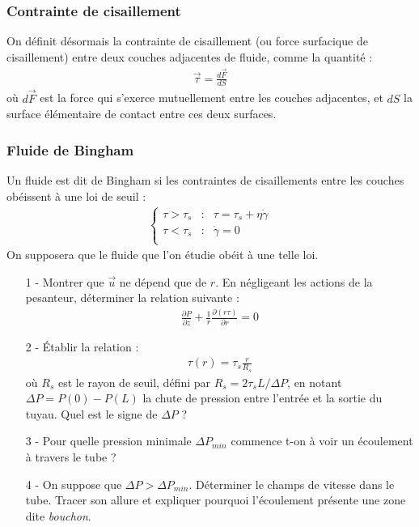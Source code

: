 \documentclass{report}
\begin{document}
\subsubsection*{Contrainte de cisaillement}

On définit désormais la contrainte de cisaillement (ou force surfacique de cisaillement) entre deux couches adjacentes de fluide, comme la quantité : 
\begin{align*}
	\vec{\tau}=\frac{d\vec{F}}{dS}
\end{align*}
où $d\vec{F}$ est la force qui s'exerce mutuellement entre les couches adjacentes, et $dS$ la surface élémentaire de contact entre ces deux surfaces.

\subsubsection*{Fluide de Bingham}

Un fluide est dit de Bingham si les contraintes de cisaillements entre les couches obéissent à une loi de seuil : 
\begin{align*}
	\left\lbrace
\begin{array}{ccc}
\tau>\tau_s & : & \tau = \tau_s+\eta\dot{\gamma} \\
\tau<\tau_s & : & \dot{\gamma}=0\\
\end{array}\right.
\end{align*}
On supposera que le fluide que l'on étudie obéit à une telle loi. 

\begin{itemize}
	\item[1 - ] Montrer que $\vec{u}$ ne dépend que de $r$. En négligeant les actions de la pesanteur, déterminer la relation suivante : 
	\begin{align*}
		\frac{\partial P}{\partial z} + \frac{1}{r}\frac{\partial (r\tau)}{\partial r}=0
	\end{align*}
	\item[2 - ] Établir la relation :
	\begin{align*}
		\tau(r) = \tau_s\frac{r}{R_s}
	\end{align*}
	où $R_s$ est le rayon de seuil, défini par $R_s=2\tau_s L/\Delta P$, en notant $\Delta P = P(0)-P(L)$ la chute de pression entre l'entrée et la sortie du tuyau. Quel est le signe de $\Delta P$ ?

	\item[3 - ] Pour quelle pression minimale $\Delta P_{min}$ commence t-on à voir un écoulement à travers le tube ?
	
	\item[4 - ] On suppose que $\Delta P>\Delta P_{min}$. Déterminer le champs de vitesse dans le tube. Tracer son allure et expliquer pourquoi l'écoulement présente une zone dite \textit{bouchon}.
	
	
\end{itemize}
\end{document}
